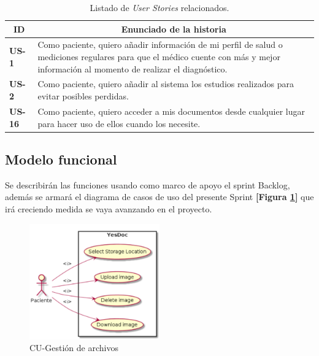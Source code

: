 \begin{table}[h]
    \centering
	\begin{tabular}{|l|p{9cm}|}
	\hline
        \multicolumn{1}{|c|}{\textbf{ID}} &
        \multicolumn{1}{|c|}{\textbf{Enunciado de la historia}} \\          
    \hline
        \textbf{US-1 } & Como paciente, quiero  añadir información de mi perfil de salud o mediciones regulares para que el médico cuente con más y mejor información al momento de realizar el diagnóstico. \\
    \hline
        \textbf{US-2 } & Como paciente, quiero añadir al sistema los estudios realizados para evitar posibles perdidas.\\
     \hline
        \textbf{US-16 } & Como paciente, quiero acceder a mis documentos desde cualquier lugar para hacer uso de ellos cuando los necesite.\\
     \hline   
    \end{tabular}
    \caption{Listado de \textit{User Stories} relacionados.}
    \label{US-Sprint7}
\end{table}

\subsection{Modelo funcional} 
Se describirán las funciones usando como marco de apoyo el sprint Backlog, además se armará el diagrama de casos de uso del presente Sprint \textbf{[Figura \ref{6-cu_file_upload}]} que irá creciendo  medida se vaya avanzando en el proyecto.

    \begin{figure}[h]
        \centering
        \includegraphics[width=0.5\textwidth]{img/cu_file_upload}
        \caption{CU-Gestión de archivos}
		\label{6-cu_file_upload}
    \end{figure}
    
\newpage

